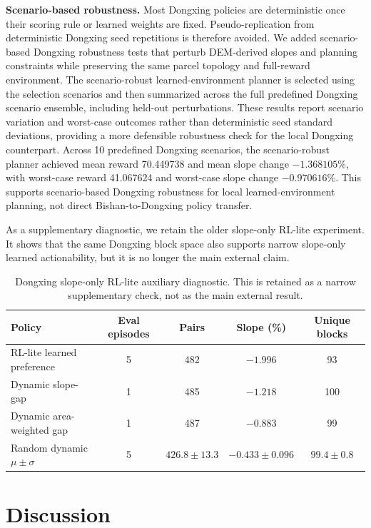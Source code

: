 \documentclass[11pt]{article}
\begin{document}
\textbf{Scenario-based robustness.} Most Dongxing policies are deterministic once their scoring rule or learned weights are fixed. Pseudo-replication from deterministic Dongxing seed repetitions is therefore avoided. We added scenario-based Dongxing robustness tests that perturb DEM-derived slopes and planning constraints while preserving the same parcel topology and full-reward environment. The scenario-robust learned-environment planner is selected using the selection scenarios and then summarized across the full predefined Dongxing scenario ensemble, including held-out perturbations. These results report scenario variation and worst-case outcomes rather than deterministic seed standard deviations, providing a more defensible robustness check for the local Dongxing counterpart. Across 10 predefined Dongxing scenarios, the scenario-robust planner achieved mean reward 70.449738 and mean slope change $-1.368105\%$, with worst-case reward 41.067624 and worst-case slope change $-0.970616\%$. This supports scenario-based Dongxing robustness for local learned-environment planning, not direct Bishan-to-Dongxing policy transfer.

As a supplementary diagnostic, we retain the older slope-only RL-lite experiment. It shows that the same Dongxing block space also supports narrow slope-only learned actionability, but it is no longer the main external claim.

\begin{table}[htbp]
\centering
\scriptsize
\setlength{\tabcolsep}{3pt}
\caption{Dongxing slope-only RL-lite auxiliary diagnostic. This is retained as a narrow supplementary check, not as the main external result.}
\label{tab:dongxing_rl_lite}
\begin{tabular}{lcccc}
\toprule
Policy & Eval episodes & Pairs & Slope (\%) & Unique blocks \\
\midrule
RL-lite learned preference & 5 & 482 & $\mathbf{-1.996}$ & 93 \\
Dynamic slope-gap & 1 & 485 & $-1.218$ & 100 \\
Dynamic area-weighted gap & 1 & 487 & $-0.883$ & 99 \\
Random dynamic $\mu \pm \sigma$ & 5 & $426.8 \pm 13.3$ & $-0.433 \pm 0.096$ & $99.4 \pm 0.8$ \\
\bottomrule
\end{tabular}
\end{table}


\section{Discussion}
\label{sec:discussion}
\end{document}

